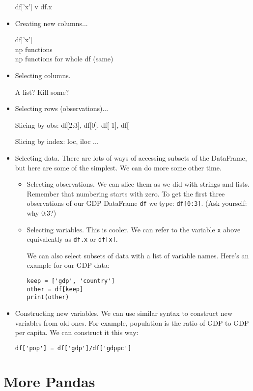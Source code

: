 \documentclass[11pt]{article}
\begin{document}
\begin{itemize}
df['x'] v df.x

\item Creating new columns...

df['x'] \\
np functions \\
np functions for whole df (same)

\item Selecting columns.

A list?  Kill some?

\item Selecting rows (observations)...

Slicing by obs:  df[2:3], df[0], df[-1], df[

Slicing by index: loc, iloc ...

\item Selecting data.
There are lots of ways of accessing subsets of the DataFrame,
but here are some of the simplest.
We can do more some other time.
\begin{itemize}
\item Selecting observations.  We can slice them as we did with strings
and lists.  Remember that numbering starts with zero.
To get the first three observations of our GDP DataFrame {\tt df} we type:
{\tt df[0:3]}.
(Ask yourself:  why 0:3?)

\item Selecting variables.  This is cooler.
We can refer to the variable {\tt x} above equivalently as
{\tt df.x} or {\tt df[x]}.

We can also select subsets of data with a list of variable names.
Here's an example for our GDP data:
\begin{verbatim}
keep = ['gdp', 'country']
other = df[keep]
print(other)
\end{verbatim}
\end{itemize}

\item Constructing new variables.
We can use similar syntax to construct new variables from old ones.
For example, population is the ratio of GDP to GDP per capita.
We can construct it this way:
\begin{verbatim}
df['pop'] = df['gdp']/df['gdppc']
\end{verbatim}

\end{itemize}


\section{More Pandas}
\end{document}
